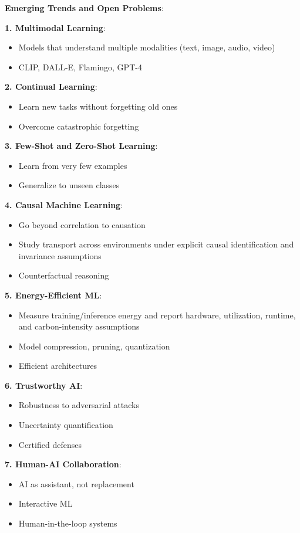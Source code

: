 \documentclass[11pt,twoside]{article}
\numberwithin{equation}{section}
\theoremstyle{plain}
\theoremstyle{definition}
\theoremstyle{remark}
\newenvironment{keyidea}{
  \begin{tcolorbox}[colback=yellow!5!white,
                    colframe=yellow!50!black,
                    title=Key Idea,
                    breakable,
                    enhanced,
                    sharp corners,
                    boxrule=0.8pt,
                    left=6pt, right=6pt, top=6pt, bottom=6pt]
}{
  \end{tcolorbox}
}
\begin{document}
\begin{keyidea}
\textbf{Emerging Trends and Open Problems}:

\textbf{1. Multimodal Learning}:
\begin{itemize}
\item Models that understand multiple modalities (text, image, audio, video)
\item CLIP, DALL-E, Flamingo, GPT-4
\end{itemize}

\textbf{2. Continual Learning}:
\begin{itemize}
\item Learn new tasks without forgetting old ones
\item Overcome catastrophic forgetting
\end{itemize}

\textbf{3. Few-Shot and Zero-Shot Learning}:
\begin{itemize}
\item Learn from very few examples
\item Generalize to unseen classes
\end{itemize}

\textbf{4. Causal Machine Learning}:
\begin{itemize}
\item Go beyond correlation to causation
\item Study transport across environments under explicit causal identification and invariance assumptions
\item Counterfactual reasoning
\end{itemize}

\textbf{5. Energy-Efficient ML}:
\begin{itemize}
\item Measure training/inference energy and report hardware, utilization, runtime, and carbon-intensity assumptions
\item Model compression, pruning, quantization
\item Efficient architectures
\end{itemize}

\textbf{6. Trustworthy AI}:
\begin{itemize}
\item Robustness to adversarial attacks
\item Uncertainty quantification
\item Certified defenses
\end{itemize}

\textbf{7. Human-AI Collaboration}:
\begin{itemize}
\item AI as assistant, not replacement
\item Interactive ML
\item Human-in-the-loop systems
\end{itemize}


\end{keyidea}
\end{document}
